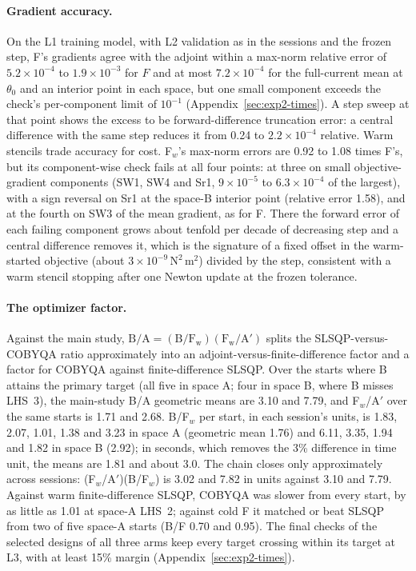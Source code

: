 \paragraph{Gradient accuracy.}
On the L1 training model, with L2 validation as in the sessions and the
frozen step, F's gradients agree with the adjoint within a max-norm relative
error of $5.2\times10^{-4}$ to $1.9\times10^{-3}$ for $F$ and at most
$7.2\times10^{-4}$ for the full-current mean at $\theta_0$ and an interior
point in each space, but one small component exceeds the check's
per-component limit of $10^{-1}$ (Appendix~\ref{sec:exp2-times}). A step
sweep at that point shows the excess to be forward-difference truncation
error: a central difference with the same step reduces it from 0.24 to
$2.2\times10^{-4}$ relative. Warm stencils trade accuracy for cost. F$_w$'s
max-norm errors are 0.92 to 1.08 times F's, but its component-wise check
fails at all four points: at three on small objective-gradient components
(SW1, SW4 and Sr1, $9\times10^{-5}$ to $6.3\times10^{-4}$ of the largest),
with a sign reversal on Sr1 at the space-B interior point (relative error
1.58), and at the fourth on SW3 of the mean gradient, as for F. There
the forward error of each failing component grows about tenfold per decade
of decreasing step and a central difference removes it, which is the
signature of a fixed offset in the warm-started objective (about
$3\times10^{-9}\,\mathrm{N^2\,m^2}$) divided by the step, consistent with
a warm stencil stopping after one Newton update at the frozen tolerance.

\paragraph{The optimizer factor.}
Against the main study, $\mathrm{B/A}=(\mathrm{B/F_w})(\mathrm{F_w/A'})$
splits the SLSQP-versus-COBYQA ratio approximately into an
adjoint-versus-finite-difference factor and a factor for COBYQA against
finite-difference SLSQP. Over the starts where B attains the primary target
(all five in space A; four in space B, where B misses LHS~3), the main-study
B/A geometric means are 3.10 and 7.79, and F$_w$/A$'$ over the same starts
is 1.71 and 2.68. B/F$_w$ per start, in each session's units, is 1.83,
2.07, 1.01, 1.38 and 3.23 in space A (geometric mean 1.76) and 6.11, 3.35,
1.94 and 1.82 in space B (2.92); in seconds, which removes the 3\%
difference in time unit, the means are 1.81 and about 3.0. The chain
closes only approximately across sessions: (F$_w$/A$'$)(B/F$_w$) is 3.02
and 7.82 in units against 3.10 and 7.79. Against warm finite-difference
SLSQP, COBYQA was slower from every start, by as little as 1.01 at
space-A LHS~2; against cold F it matched or beat SLSQP from two of five
space-A starts (B/F 0.70 and 0.95). The final checks of the selected
designs of all three arms keep every target crossing within its target at
L3, with at least 15\% margin (Appendix~\ref{sec:exp2-times}).
